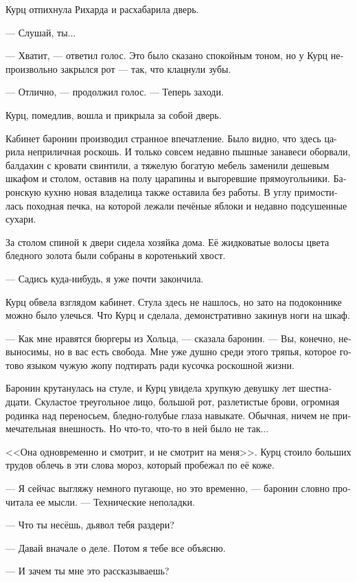 \documentclass[a4paper,12pt,fleqn]{book}\usepackage{cooltooltips}\usepackage{polyglossia}\setdefaultlanguage[babelshorthands=true]{russian}\setotherlanguage{english}\defaultfontfeatures{Ligatures=TeX,Mapping=tex-text} \usepackage{xcolor}\definecolor{lightgray}{HTML}{bbbbbb}\color{lightgray}\newcommand{\ml}[3]{\textenglish{\textcolor{black}{#3}}}
\newcommand{\asterism}{\vspace{1em}{\centering\Large\bfseries$\ast~\ast~\ast$\par}\vspace{1em}}
\begin{document}
Курц отпихнула Рихарда и расхабарила дверь.

--- Слушай, ты...

--- Хватит, --- ответил голос.
Это было сказано спокойным тоном, но у Курц непроизвольно закрылся рот --- так, что клацнули зубы.

--- Отлично, --- продолжил голос.
--- Теперь заходи.

Курц, помедлив, вошла и прикрыла за собой дверь.

Кабинет баронин производил странное впечатление.
Было видно, что здесь царила неприличная роскошь.
И только совсем недавно пышные занавеси оборвали, балдахин с кровати свинтили, а тяжелую богатую мебель заменили дешевым шкафом и столом, оставив на полу царапины и выгоревшие прямоугольники.
Баронскую кухню новая владелица также оставила без работы.
В углу примостилась походная печка, на которой лежали печёные яблоки и недавно подсушенные сухари.

За столом спиной к двери сидела хозяйка дома.
Её жидковатые волосы цвета бледного золота были собраны в коротенький хвост.

--- Садись куда-нибудь, я уже почти закончила.

Курц обвела взглядом кабинет.
Стула здесь не нашлось, но зато на подоконнике можно было улечься.
Что Курц и сделала, демонстративно закинув ноги на шкаф.

--- Как мне нравятся бюргеры из Хольца, --- сказала баронин.
--- Вы, конечно, невыносимы, но в вас есть свобода.
Мне уже душно среди этого тряпья, которое готово языком чужую жопу подтирать ради кусочка роскошной жизни.

Баронин крутанулась на стуле, и Курц увидела хрупкую девушку лет шестнадцати.
Скуластое треугольное лицо, большой рот, разлетистые брови, огромная родинка над переносьем, бледно-голубые глаза навыкате.
Обычная, ничем не примечательная внешность.
Но что-то, что-то в ней было не так...

<<Она одновременно и смотрит, и не смотрит на меня>>.
Курц стоило больших трудов облечь в эти слова мороз, который пробежал по её коже.

--- Я сейчас выгляжу немного пугающе, но это временно, --- баронин словно прочитала ее мысли.
--- Технические неполадки.

--- Что ты несёшь, дьявол тебя раздери?

--- Давай вначале о деле.
Потом я тебе все объясню.

\asterism

--- И зачем ты мне это рассказываешь?
\end{document}
